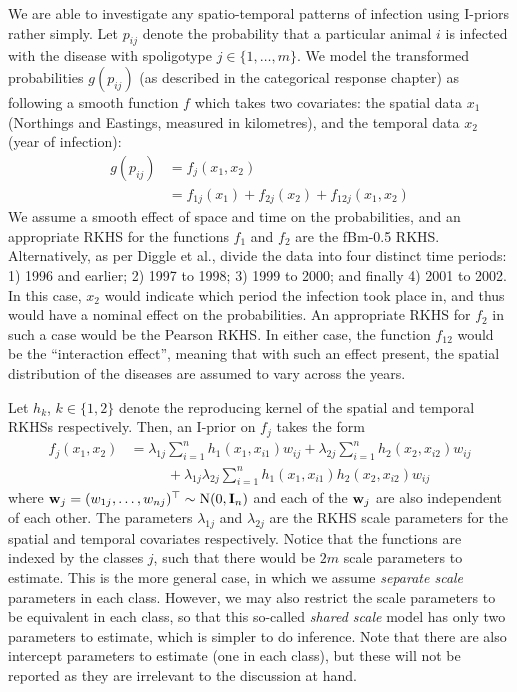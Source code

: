 \documentclass[a4paper,showframe,11pt]{report}\usepackage[]{graphicx}\usepackage[]{color}
\begin{document}
We are able to investigate any spatio-temporal patterns of infection using I-priors rather simply.
Let $p_{ij}$ denote the probability that a particular animal $i$ is infected with the disease with spoligotype $j \in \{1,\dots,m\}$.
We model the transformed probabilities $g(p_{ij})$ (as described in the categorical response chapter) as following a smooth function $f$ which takes two covariates: the spatial data $x_1$ (Northings and Eastings, measured in kilometres), and the temporal data $x_2$ (year of infection):
\begin{align*}
  g(p_{ij}) &= f_j(x_1, x_2) \\
  &= f_{1j}(x_1) + f_{2j}(x_2) + f_{12j}(x_1, x_2)
\end{align*}
We assume a smooth effect of space and time on the probabilities, and an appropriate RKHS for the functions $f_1$ and $f_2$ are the fBm-0.5 RKHS. Alternatively, as per Diggle et al., divide the data into four distinct time periods: 1) 1996 and earlier; 2) 1997 to 1998; 3) 1999 to 2000; and finally 4) 2001 to 2002. In this case, $x_2$ would indicate which period the infection took place in, and thus would have a nominal effect on the probabilities. An appropriate RKHS for $f_2$ in such a case would be the Pearson RKHS. In either case, the function $f_{12}$ would be the ``interaction effect'', meaning that with such an effect present, the spatial distribution of the diseases are assumed to vary across the years.

Let $h_k$, $k \in \{1,2\}$ denote the reproducing kernel of the spatial and temporal RKHSs respectively.
Then, an I-prior on $f_j$ takes the form
\begin{align*}
  f_j(x_1, x_2) &= \lambda_{1j} \sum_{i=1}^n h_1(x_1, x_{i1}) w_{ij} +
  \lambda_{2j} \sum_{i=1}^n h_2(x_2, x_{i2}) w_{ij} \\
  &\phantom{==} + \lambda_{1j} \lambda_{2j} \sum_{i=1}^n  h_1(x_1, x_{i1})h_2(x_2, x_{i2}) w_{ij}
\end{align*}
where ${\mathbf w}_j = (w_{1j}, \dots, w_{nj})^\top \sim \operatorname{N}(0,{\mathbf I}_n)$ and each of the ${\mathbf w}_j$ are also independent of each other.
The parameters $\lambda_{1j}$ and $\lambda_{2j}$ are the RKHS scale parameters for the spatial and temporal covariates respectively.
Notice that the functions are indexed by the classes $j$, such that there would be $2m$ scale parameters to estimate.
This is the more general case, in which we assume \emph{separate scale} parameters in each class.
However, we may also restrict the scale parameters to be equivalent in each class, so that this so-called \emph{shared scale} model has only two parameters to estimate, which is simpler to do inference.
Note that there are also intercept parameters to estimate (one in each class), but these will not be reported as they are irrelevant to the discussion at hand.
\end{document}
